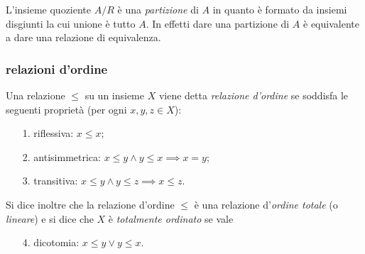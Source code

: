 L'insieme quoziente $A/R$ è una \emph{partizione}%
%
 di $A$ in quanto 
è formato da insiemi disgiunti la cui unione è tutto $A$. In effetti 
dare una partizione di $A$ è equivalente a dare una relazione 
di equivalenza.

\subsubsection{relazioni d'ordine}

\begin{definition}
  \label{def:ordine}%
  Una relazione
  $\le$ su un insieme $X$ viene detta
  \emph{relazione d'ordine}%
%
  se soddisfa le seguenti proprietà (per ogni $x,y,z\in X$):
  \begin{enumerate}
    \item[1.] riflessiva: $x\le x$;
    \item[2.] antisimmetrica: $x\le y \land y\le x \implies x=y$;
    \item[3.] transitiva: $x\le y \land y\le z \implies x\le z$.
  \end{enumerate}
  Si dice inoltre che la relazione d'ordine $\le$
  è una relazione d'\emph{ordine totale}
%
  (o \emph{lineare}) 
  e si dice che $X$ è \emph{totalmente ordinato} se vale
  \begin{enumerate}
    \item[4.] dicotomia: $x\le y \lor y\le x$.
  \end{enumerate}
\end{definition}

